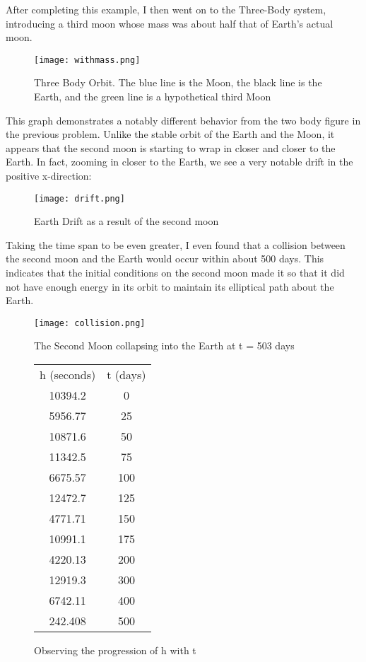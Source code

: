 \documentclass[11pt,letterpaper]{article}
\begin{document}
After completing this example, I then went on to the Three-Body system, introducing a third moon whose mass was about half that of Earth's actual moon.
\begin{figure}[htb!]
\begin{center}
\leavevmode
\texttt{[image: withmass.png]}
\end{center}
\caption{Three Body Orbit. The blue line is the Moon, the black line is the Earth, and the green line is a hypothetical third Moon}
\label{fbigh}
\end{figure}

This graph demonstrates a notably different behavior from the two body figure in the previous problem. Unlike the stable orbit of the Earth and the Moon, it appears that the second moon is starting to wrap in closer and closer to the Earth. In fact, zooming in closer to the Earth, we see a very notable drift in the positive x-direction:
\begin{figure}[htb!]
\begin{center}
\leavevmode
\texttt{[image: drift.png]}
\end{center}
\caption{Earth Drift as a result of the second moon}
\label{fbigh}
\end{figure}

Taking the time span to be even greater, I even found that a collision between the second moon and the Earth would occur within about 500 days. This indicates that the initial conditions on the second moon made it so that it did not have enough energy in its orbit to maintain its elliptical path about the Earth.
\begin{figure}[htb!]
\begin{center}
\leavevmode
\texttt{[image: collision.png]}
\end{center}
\caption{The Second Moon collapsing into the Earth at t = 503 days}
\label{fbigh}
\end{figure}

\begin{figure}[htb!]
\begin{center}
\leavevmode
\begin{tabular}{ c c }
h (seconds)	&	t (days)	\\
10394.2	&	0	\\
5956.77	&	25	\\
10871.6	&	50	\\
11342.5	&	75	\\
6675.57	&	100	\\
12472.7	&	125	\\
4771.71	&	150	\\
10991.1	&	175	\\
4220.13	&	200	\\
12919.3	&	300	\\
6742.11	&	400	\\
242.408	&	500	\\
\end{tabular}
\end{center}
\caption{Observing the progression of h with t}
\label{fbigh}
\end{figure}
\end{document}

